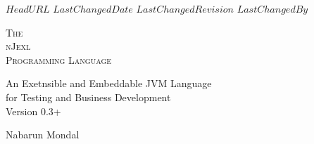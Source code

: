\svnidlong
{$HeadURL$}
{$LastChangedDate$}
{$LastChangedRevision$}
{$LastChangedBy$}

\thispagestyle{titlepage}

\begin{center}
  \newlength{\parSepLength}
  \setlength{\parSepLength}{10ex}

  \Large
  \centering

  \thinRule\par
  \par\vspace{0.15\parSepLength}
  \begin{minipage}{\textwidth}
    \centering
    \fontsize{36pt}{20pt}\selectfont\titleColor\scshape
    The \\ nJexl \\ Programming Language  
  \end{minipage}
  \par\vspace{0.25\parSepLength}
  \par\thinRule

  \vspace{0.125\parSepLength}

  \begin{minipage}{\textwidth}
    \centering
    An Exetnsible and Embeddable JVM Language \\ for Testing and Business Development \\
    Version 0.3+
  \end{minipage}

  \vfill

  \begin{minipage}{\textwidth}
    \centering
    \Large
    Nabarun Mondal
  \end{minipage}

  \vfill

  \begin{minipage}{0.8\textwidth}
    \centering
    \small
  \end{minipage}
\end{center}

